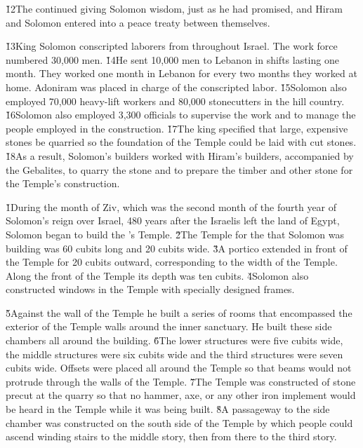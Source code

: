 \v{12}The  continued giving Solomon wisdom, just as he had promised, and Hiram and Solomon entered into a peace treaty between themselves.

\v{13}King Solomon conscripted laborers from throughout Israel. The work force numbered 30,000 men. \v{14}He sent 10,000 men to Lebanon in shifts lasting one month. They worked one month in Lebanon for every two months they worked at home. Adoniram was placed in charge of the conscripted labor. \v{15}Solomon also employed 70,000 heavy-lift workers and 80,000 stonecutters in the hill country. \v{16}Solomon also employed 3,300 officials to supervise the work and to manage the people employed in the construction. \v{17}The king specified that large, expensive stones be quarried so the foundation of the Temple could be laid with cut stones. \v{18}As a result, Solomon's builders worked with Hiram's builders, accompanied by the Gebalites, to quarry the stone and to prepare the timber and other stone for the Temple's construction.

\v{1}During the month of Ziv, which was the second month of the fourth year of Solomon's reign over Israel, 480 years after the Israelis left the land of Egypt, Solomon began to build the 's Temple. \v{2}The Temple for the  that Solomon was building was 60 cubits long and 20 cubits wide. \v{3}A portico extended in front of the Temple for 20 cubits outward, corresponding to the width of the Temple. Along the front of the Temple its depth was ten cubits. \v{4}Solomon also constructed windows in the Temple with specially designed frames.

\v{5}Against the wall of the Temple he built a series of rooms that encompassed the exterior of the Temple walls around the inner sanctuary. He built these side chambers all around the building. \v{6}The lower structures were five cubits wide, the middle structures were six cubits wide and the third structures were seven cubits wide. Offsets were placed all around the Temple so that beams would not protrude through the walls of the Temple. \v{7}The Temple was constructed of stone precut at the quarry so that no hammer, axe, or any other iron implement would be heard in the Temple while it was being built. \v{8}A passageway to the side chamber was constructed on the south side of the Temple by which people could ascend winding stairs to the middle story, then from there to the third story.

